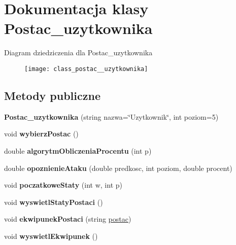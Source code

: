 \hypertarget{class_postac__uzytkownika}{}\section{Dokumentacja klasy Postac\+\_\+uzytkownika}
\label{class_postac__uzytkownika}
Diagram dziedziczenia dla Postac\+\_\+uzytkownika\begin{figure}[H]
\begin{center}
\leavevmode
\texttt{[image: class\_postac\_\_uzytkownika]}
\end{center}
\end{figure}
\subsection*{Metody publiczne}
\begin{DoxyCompactItemize}
\item 
{\bfseries Postac\+\_\+uzytkownika} (string nazwa=\char`\"{}Uzytkownik\char`\"{}, int poziom=5)\hypertarget{class_postac__uzytkownika_a82711323bfb499ed192674bc552d503f}{}\label{class_postac__uzytkownika_a82711323bfb499ed192674bc552d503f}

\item 
void {\bfseries wybierz\+Postac} ()\hypertarget{class_postac__uzytkownika_a2f62bd3ed60202156657217a710b4bb2}{}\label{class_postac__uzytkownika_a2f62bd3ed60202156657217a710b4bb2}

\item 
double {\bfseries algorytm\+Obliczenia\+Procentu} (int p)\hypertarget{class_postac__uzytkownika_ae36ae0e7edd1bb7392bb79095e8d06a9}{}\label{class_postac__uzytkownika_ae36ae0e7edd1bb7392bb79095e8d06a9}

\item 
double {\bfseries opoznienie\+Ataku} (double predkosc, int poziom, double procent)\hypertarget{class_postac__uzytkownika_af0e35bb1670f52785a2de82945a9832a}{}\label{class_postac__uzytkownika_af0e35bb1670f52785a2de82945a9832a}

\item 
void {\bfseries poczatkowe\+Staty} (int w, int p)\hypertarget{class_postac__uzytkownika_aec17a5c231e01b81aabd4fc6524cd2b2}{}\label{class_postac__uzytkownika_aec17a5c231e01b81aabd4fc6524cd2b2}

\item 
void {\bfseries wyswietl\+Staty\+Postaci} ()\hypertarget{class_postac__uzytkownika_a51bec55695052a5c4dbadeaa2c404bff}{}\label{class_postac__uzytkownika_a51bec55695052a5c4dbadeaa2c404bff}

\item 
void {\bfseries ekwipunek\+Postaci} (string \hyperlink{classpostac}{postac})\hypertarget{class_postac__uzytkownika_a9c856bd6008366f71b64c542ee2d31c7}{}\label{class_postac__uzytkownika_a9c856bd6008366f71b64c542ee2d31c7}

\item 
void {\bfseries wyswietl\+Ekwipunek} ()\hypertarget{class_postac__uzytkownika_a35341b9abe3a388ac089b951eae167d9}{}\label{class_postac__uzytkownika_a35341b9abe3a388ac089b951eae167d9}

\end{DoxyCompactItemize}
